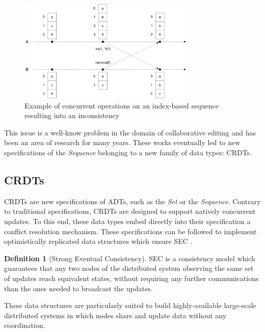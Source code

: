 \documentclass{article}
\theoremstyle{definition}
\newtheorem{definition}{Definition}
\begin{document}
\begin{figure}
    \centering
    \includegraphics[width=0.75\textwidth]{img/index-based-seq.pdf}
    \caption{Example of concurrent operations on an index-based sequence resulting into an inconsistency}
    \label{fig:basic-seq-divergence}
\end{figure}

This issue is a well-know problem in the domain of collaborative editing and has been an area of research for many years.
These works eventually led to new specifications of the \emph{Sequence} belonging to a new family of data types: \acfp{CRDT}. 

\subsection{\acfp{CRDT}}

\acfp{CRDT} \cite{shapiro:inria-00555588, shapiro_2011_crdt} are new specifications of \acp{ADT}, such as the \emph{Set} or the \emph{Sequence}.
Contrary to traditional specifications, \acp{CRDT} are designed to support natively concurrent updates.
To this end, these data types embed directly into their specification a conflict resolution mechanism.
These specifications can be followed to implement optimistically replicated data structures which ensure \acf{SEC} \cite{shapiro_2011_crdt}.

\begin{definition}[Strong Eventual Consistency]\label{def:sec}
\acf{SEC} is a consistency model which guarantees that any two nodes of the distributed system observing the same set of updates reach equivalent states, without requiring any further communications than the ones needed to broadcast the updates.
\end{definition}

These data structures are particularly suited to build highly-available large-scale distributed systems in which nodes share and update data without any coordination.
\end{document}
